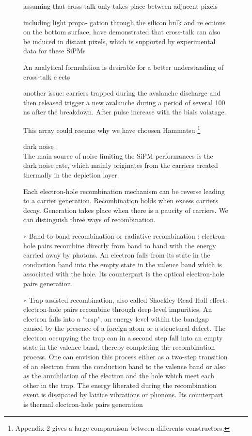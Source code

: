 \begin{figure}[!hbtp]
{{  assuming that cross-talk only takes place between adjacent pixels

  including light propa-
  gation through the silicon bulk and re
  ections on the bottom surface, have demonstrated
  that cross-talk can also be induced in distant pixels, which is supported by experimental
  data for these SiPMs

  An analytical formulation is desirable for a better understanding of cross-talk eects

  
  another issue: carriers trapped during the avalanche discharge and then released trigger a new avalanche during a period of several 100 ns after 
  the breakdown. After pulse increase with the biais volatage. 

  This array could resume why we have choosen Hammatsu \footnote{Appendix 2 gives a large comparaison between differents constructors.}
  

  dark noise : 
  \\
  The main source of noise limiting the SiPM performances is the dark noise rate, which mainly originates from the carriers created thermally in the 
  depletion layer.
  
  Each electron-hole recombination mechanism can be reverse leading to a carrier generation. Recombination holds when excess carriers decay. 
  Generation takes place when there is a paucity of carriers. We can distinguish three ways of recombination. 
  
  ∗ Band-to-band recombination or radiative recombination : electron-hole pairs recombine directly from band to band with the energy carried away by photons.
  An electron falls from its state in the conduction band into the empty state in the valence band which is associated with the hole. Its counterpart is the 
  optical electron-hole pairs generation.
  
  ∗ Trap assisted recombination, also called Shockley Read Hall effect: electron-hole pairs recombine through deep-level impurities. An electron falls 
  into a "trap", an energy level within the bandgap caused by the presence of a foreign atom or a structural defect. The electron occupying the trap can in 
  a second step fall into an empty state in the valence band, thereby completing the recombination process. One can envision this process either as a 
  two-step transition of an electron from the conduction band to the valence band or also as the annihilation of the electron and the hole which meet each other in the trap.
  The energy liberated during the recombination event is dissipated by lattice vibrations or
  phonons. Its counterpart is thermal electron-hole pairs generation
  
}}
\end{figure}
